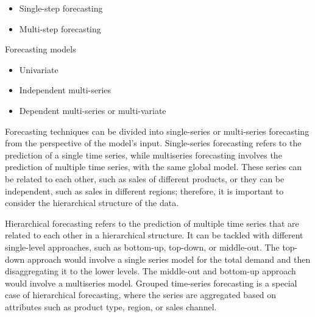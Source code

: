 




\begin{itemize}
    \item Single-step forecasting
    \item Multi-step forecasting
\end{itemize}

Forecasting models
\begin{itemize}
    \item Univariate
    \item Independent multi-series
    \item Dependent multi-series or multi-variate
\end{itemize}

Forecasting techniques can be divided into single-series or multi-series forecasting from the perspective of the model's input.
Single-series forecasting refers to the prediction of a single time series, while multiseries forecasting involves the prediction of multiple time series, with the same global model\cite{joachim2023demand}.
These series can be related to each other, such as sales of different products, or they can be independent, such as sales in different regions; therefore, it is important to consider the hierarchical structure of the data.




Hierarchical forecasting refers to the prediction of multiple time series that are related to each other in a hierarchical structure\cite{hyndman2018forecasting}.
It can be tackled with different single-level approaches, such as bottom-up, top-down, or middle-out\cite{hyndman2018forecasting}.
The top-down approach would involve a single series model for the total demand and then disaggregating it to the lower levels.
The middle-out and bottom-up approach would involve a multiseries model.
Grouped time-series forecasting is a special case of hierarchical forecasting, where the series are aggregated based on attributes such as product type, region, or sales channel.

